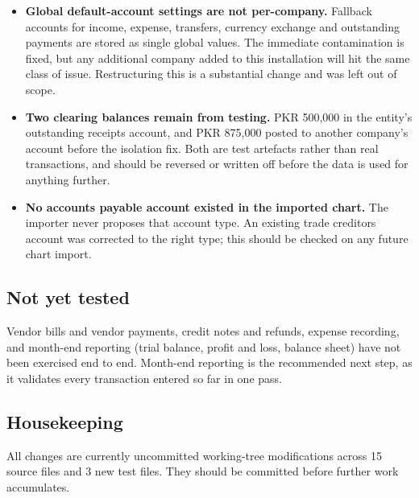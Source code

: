 \documentclass[11pt,a4paper]{article}
\begin{document}
\begin{itemize}[leftmargin=*]
  \item \textbf{Global default-account settings are not per-company.} Fallback accounts for income,
    expense, transfers, currency exchange and outstanding payments are stored as single global values.
    The immediate contamination is fixed, but any additional company added to this installation will hit
    the same class of issue. Restructuring this is a substantial change and was left out of scope.
  \item \textbf{Two clearing balances remain from testing.} PKR 500,000 in the entity's outstanding
    receipts account, and PKR 875,000 posted to another company's account before the isolation fix. Both
    are test artefacts rather than real transactions, and should be reversed or written off before the
    data is used for anything further.
  \item \textbf{No accounts payable account existed in the imported chart.} The importer never proposes
    that account type. An existing trade creditors account was corrected to the right type; this should
    be checked on any future chart import.
\end{itemize}

\subsection{Not yet tested}

Vendor bills and vendor payments, credit notes and refunds, expense recording, and month-end reporting
(trial balance, profit and loss, balance sheet) have not been exercised end to end. Month-end reporting
is the recommended next step, as it validates every transaction entered so far in one pass.

\subsection{Housekeeping}

All changes are currently uncommitted working-tree modifications across 15 source files and 3 new test
files. They should be committed before further work accumulates.
\end{document}
